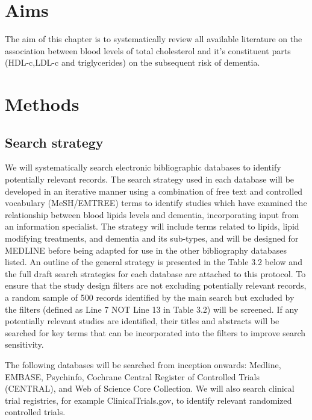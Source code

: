 \documentclass[a4paper, nobind]{templates/ociamthesis}
\begin{document}
\hypertarget{aims}{%
\section{Aims}\label{aims}}

The aim of this chapter is to systematically review all available literature on the association between blood levels of total cholesterol and it's constituent parts (HDL-c,LDL-c and triglycerides) on the subsequent risk of dementia.

\hypertarget{methods}{%
\section{Methods}\label{methods}}

\hypertarget{search-strategy}{%
\subsection{Search strategy}\label{search-strategy}}

We will systematically search electronic bibliographic databases to identify potentially relevant records. The search strategy used in each database will be developed in an iterative manner using a combination of free text and controlled vocabulary (MeSH/EMTREE) terms to identify studies which have examined the relationship between blood lipids levels and dementia, incorporating input from an information specialist. The strategy will include terms related to lipids, lipid modifying treatments, and dementia and its sub-types, and will be designed for MEDLINE before being adapted for use in the other bibliography databases listed. An outline of the general strategy is presented in the Table 3.2 below and the full draft search strategies for each database are attached to this protocol. To ensure that the study design filters are not excluding potentially relevant records, a random sample of 500 records identified by the main search but excluded by the filters (defined as Line 7 NOT Line 13 in Table 3.2) will be screened. If any potentially relevant studies are identified, their titles and abstracts will be searched for key terms that can be incorporated into the filters to improve search sensitivity.

The following databases will be searched from inception onwards: Medline, EMBASE, Psychinfo, Cochrane Central Register of Controlled Trials (CENTRAL), and Web of Science Core Collection. We will also search clinical trial registries, for example ClinicalTrials.gov, to identify relevant randomized controlled trials.
\end{document}
